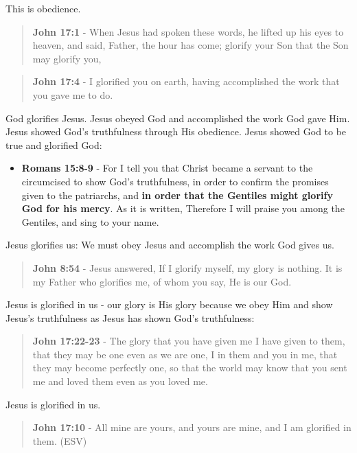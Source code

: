 \documentclass[11pt]{article}
\begin{document}
This is obedience.

\begin{quote}
\textbf{John 17:1} - When Jesus had spoken these words, he lifted up his eyes to heaven, and said, Father, the hour has come; glorify your Son that the Son may glorify you,
\end{quote}

\begin{quote}
\textbf{John 17:4} - I glorified you on earth, having accomplished the work that you gave me to do.
\end{quote}

God glorifies Jesus.
Jesus obeyed God and accomplished the work God gave Him.
Jesus showed God's truthfulness through His obedience. Jesus showed God to be true and glorified God:
\begin{itemize}
\item \textbf{Romans 15:8-9} - For I tell you that Christ became a servant to the circumcised to show God's truthfulness, in order to confirm the promises given to the patriarchs, and \textbf{in order that the Gentiles might glorify God for his mercy}. As it is written, Therefore I will praise you among the Gentiles, and sing to your name.
\end{itemize}

Jesus glorifies us:
We must obey Jesus and accomplish the work God gives us.

\begin{quote}
\textbf{John 8:54} - Jesus answered, If I glorify myself, my glory is nothing. It is my Father who glorifies me, of whom you say, He is our God.
\end{quote}

Jesus is glorified in us - our glory is His glory because we obey Him and show Jesus's truthfulness as Jesus has shown God's truthfulness:

\begin{quote}
\textbf{John 17:22-23} - The glory that you have given me I have given to them, that they may be one even as we are one, I in them and you in me, that they may become perfectly one, so that the world may know that you sent me and loved them even as you loved me.
\end{quote}

Jesus is glorified in us.

\begin{quote}
\textbf{John 17:10} - All mine are yours, and yours are mine, and I am glorified in them. (ESV)
\end{quote}
\end{document}
